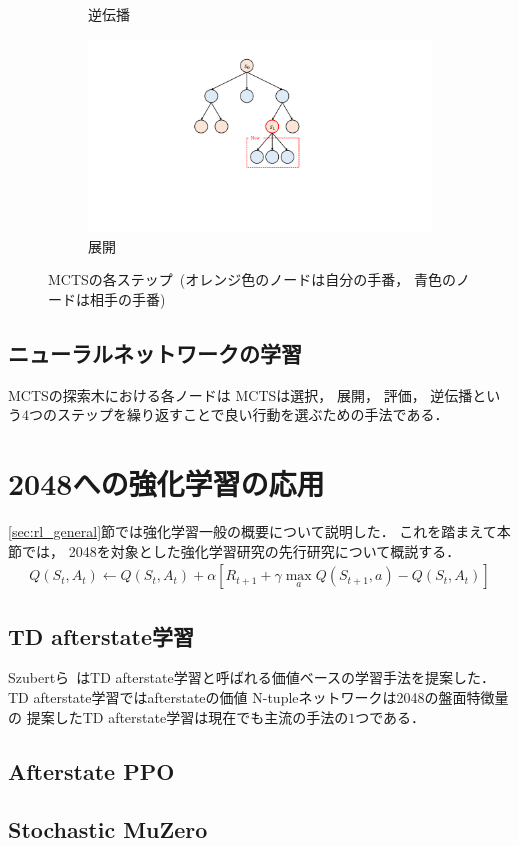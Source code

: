 \begin{figure}
\begin{subfigure}[T]{0.4\columnwidth}
    \caption{逆伝播}
    \label{fig:backpropagate}
  \end{subfigure}
  \hspace{3cm}
  \begin{subfigure}[T]{0.4\columnwidth}
    \centering
    \includegraphics[width=\columnwidth]{figures/expand_.pdf}
    \caption{展開}
    \label{fig:expand}
  \end{subfigure}
  \caption{MCTSの各ステップ~(オレンジ色のノードは自分の手番， 青色のノードは相手の手番)}
  \label{fig:mcts}
\end{figure}

\subsection{ニューラルネットワークの学習}
MCTSの探索木における各ノードは
MCTSは選択， 展開， 評価， 逆伝播という$4$つのステップを繰り返すことで良い行動を選ぶための手法である．

\section{2048への強化学習の応用}
\ref{sec:rl_general}節では強化学習一般の概要について説明した．
これを踏まえて本節では， 2048を対象とした強化学習研究の先行研究について概説する．
\begin{align}
  \label{eq:td_afterstate}
  Q(S_t, A_t) \leftarrow Q(S_t, A_t) + \alpha [R_{t+1} + \gamma \max_a Q(S_{t+1}, a) - Q(S_t, A_t)]
\end{align}


\subsection{TD afterstate学習}
Szubertら~\cite{Szubert}はTD afterstate学習と呼ばれる価値ベースの学習手法を提案した．
TD afterstate学習ではafterstateの価値
N-tupleネットワークは2048の盤面特徴量の
提案したTD afterstate学習は現在でも主流の手法の$1$つである．


\subsection{Afterstate PPO}

\subsection{Stochastic MuZero}
